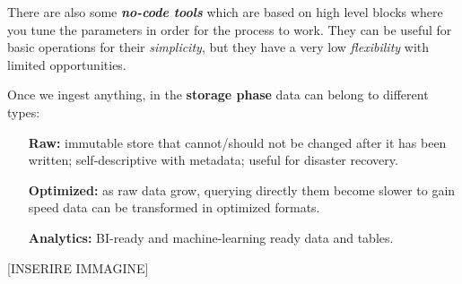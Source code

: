 There are also some \textbf{\textit{no-code tools}} which are based on high level blocks where you tune the parameters in order for the process to work. They can be useful for basic operations for their \textit{simplicity}, but they have a very low \textit{flexibility} with limited opportunities.

Once we ingest anything, in the \textbf{storage phase} data can belong to different types:
\begin{itemize}
    \item[\textbf{Raw:}] immutable store that cannot/should not be changed after it has been written; self-descriptive with metadata; useful for disaster recovery.
    \item[\textbf{Optimized:}] as raw data grow, querying directly them become slower to gain speed data can be transformed in optimized formats.
    \item[\textbf{Analytics:}] BI-ready and machine-learning ready data and tables.
\end{itemize}

[INSERIRE IMMAGINE]